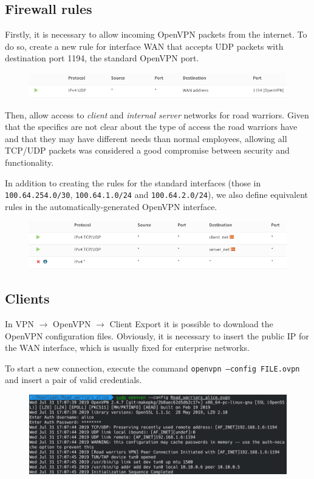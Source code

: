 \documentclass{homework}
\newcommand{\client}{\textit{client}\xspace}
\newcommand{\ser}{\textit{internal server}\xspace}
\begin{document}
    \subsection{Firewall rules}
    Firstly, it is necessary to allow incoming OpenVPN packets from the internet.
    To do so, create a new rule for interface WAN that accepts UDP packets with destination port 1194, the standard OpenVPN port.
    \begin{figure}[H]
        \centering
        \includegraphics[width=\linewidth]{openvpn/rules-vpn}
        \label{fig:openvpn-rules-vpn}
    \end{figure}
    
    Then, allow access to \client and \ser networks for road warriors.
    Given that the specifics are not clear about the type of access the road warriors have and that they may have different needs than normal employees, allowing all TCP/UDP packets was considered a good compromise between security and functionality.
    
    In addition to creating the rules for the standard interfaces (those in \texttt{100.64.254.0/30}, \texttt{100.64.1.0/24} and \texttt{100.64.2.0/24}), we also define equivalent rules in the automatically-generated OpenVPN interface.
    \begin{figure}[H]
        \centering
        \includegraphics[width=\linewidth]{openvpn/rules-clients}
        \label{fig:rules-clients}
    \end{figure}
       
    \subsection{Clients}
    In VPN $\rightarrow$ OpenVPN $\rightarrow$ Client Export it is possible to download the OpenVPN configuration files.
    Obviously, it is necessary to insert the public IP for the WAN interface, which is usually fixed for enterprise networks.
    
    To start a new connection, execute the command \texttt{openvpn --config FILE.ovpn} and insert a pair of valid credentials.
    \begin{figure}[H]
        \centering
        \includegraphics[width=\linewidth]{openvpn/client}
        \label{fig:openvpn-client}
    \end{figure}
    
\end{document}
